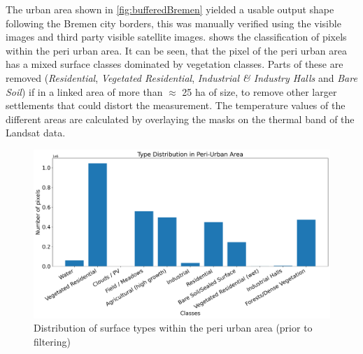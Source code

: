 \documentclass[12pt,a4paper, english,twoside]{scrartcl}
\begin{document}
      The urban area shown in \cref{fig:bufferedBremen} yielded a usable output shape following the Bremen city borders, this was manually verified using the visible images and third party visible satellite images. 
       shows the classification of pixels within the peri urban area.
      It can be seen, that the pixel of the peri urban area has a mixed surface classes dominated by vegetation classes. 
      Parts of these are removed (\textit{Residential}, \textit{Vegetated Residential}, \textit{Industrial \& Industry Halls} and \textit{Bare Soil}) if in a linked area of more than $\approx$ 25 ha of size, to remove other larger settlements that could distort the measurement.
      The temperature values of the different areas are calculated by overlaying the masks on the thermal band of the Landsat data. 
%
        \begin{figure}[!htbp]
         \centering
         \includegraphics[width=\textwidth]{img/ClassDistributionPU2019-06-29.png}
         \caption{Distribution of surface types within the peri urban area (prior to filtering)}\label{fig:classesPeri}
        \end{figure}
\end{document}
